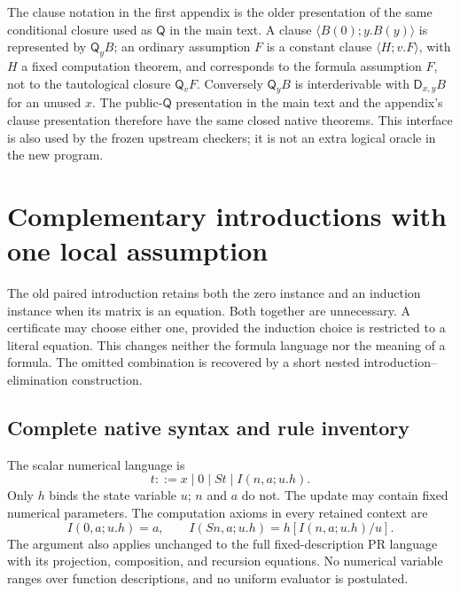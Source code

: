 \documentclass[11pt,letterpaper]{article}
\theoremstyle{definition}\newtheorem{definition}[theorem]{Definition}
\theoremstyle{remark}\newtheorem{remark}[theorem]{Remark}
\newcommand{\D}{\mathsf D}
\newcommand{\Q}{\mathsf Q}
\begin{document}
The clause notation in the first appendix is the older presentation of
the same conditional closure used as $\Q$ in the main text. A clause
$\langle B(0);y.B(y)\rangle$ is represented by $\Q_y B$; an ordinary
assumption $F$ is a constant clause $\langle H;v.F\rangle$, with
$H$ a fixed computation theorem, and corresponds to the formula assumption
$F$, not to the tautological closure $\Q_vF$. Conversely $\Q_y B$ is interderivable
with $\D_{x,y}B$ for an unused $x$. The public-$\Q$ presentation in the
main text and the appendix's clause presentation therefore have the same
closed native theorems. This interface is also used by the frozen
upstream checkers; it is not an extra logical oracle in the new program.



\section{Complementary introductions with one local assumption}
\label{sec:choice-introduction}

The old paired introduction retains both the zero instance and an
induction instance when its matrix is an equation. Both together are
unnecessary. A certificate may choose either one, provided the induction
choice is restricted to a literal equation. This changes neither the
formula language nor the meaning of a formula. The omitted combination
is recovered by a short nested introduction--elimination construction.

\subsection{Complete native syntax and rule inventory}

The scalar numerical language is
\[
 t::=x\mid0\mid St\mid I(n,a;u.h).
\]
Only $h$ binds the state variable $u$; $n$ and $a$ do not.
The update may contain fixed numerical parameters. The computation
axioms in every retained context are
\[
 I(0,a;u.h)=a,\qquad
 I(Sn,a;u.h)=h[I(n,a;u.h)/u].
 \tag{I0, IS}\label{eq:choice-computations}
\]
The argument also applies unchanged to the full fixed-description PR
language with its projection, composition, and recursion equations.
No numerical variable ranges over function descriptions, and no uniform
evaluator is postulated.
\end{document}
